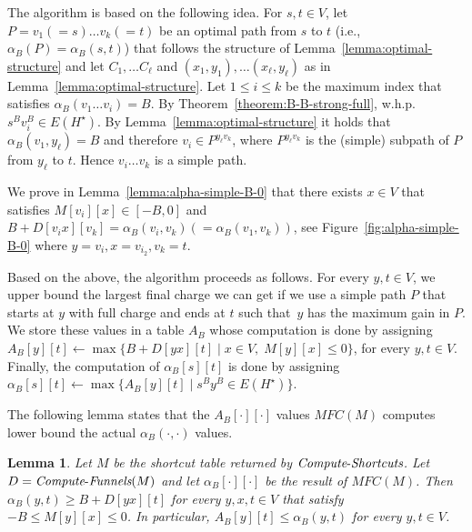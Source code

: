 \documentclass[11pt]{article}
\newtheorem{lemma}[theorem]{Lemma}
\newcommand{\ComputeF}{\mbox{{\it Compute}-{\it Funnels}}}
\newcommand{\ComputeS}{\mbox{{\it Compute}-{\it Shortcuts}}}
\begin{document}
The algorithm is based on the following idea. For $s,t \in V$, let~$P=v_1(=s)\ldots v_k(=t)$ be an optimal path from $s$ to $t$ (i.e., $\alpha_B(P)=\alpha_B(s,t)$) that follows the structure of Lemma~\ref{lemma:optimal-structure} and let $C_1, \ldots C_{\ell}$ and $(x_1,y_1),\ldots(x_{\ell},y_{\ell})$ as in Lemma~\ref{lemma:optimal-structure}.
Let $1\le i \le k$ be the maximum index that satisfies $\alpha_B(v_1 \ldots v_i) = B$. By Theorem~\ref{theorem:B-B-strong-full}, w.h.p.\ $s^B v_i^B \in E(H^\star)$. 
By Lemma~\ref{lemma:optimal-structure} it holds that $\alpha_B(v_1,y_{\ell})=B$ and therefore $v_i \in P^{y_{\ell}v_k}$, where $P^{y_{\ell}v_k}$ is the (simple) subpath of $P$ from $y_{\ell}$ to $t$. Hence $v_i \ldots v_k$ is a simple path.


We prove in Lemma~\ref{lemma:alpha-simple-B-0} that there exists $x\in V$ that satisfies $M[v_i][x]\in [-B,0]$ and $B+D[v_i x][v_k] = \alpha_B(v_i,v_k)(=\alpha_B(v_1,v_k))$, see Figure~\ref{fig:alpha-simple-B-0} where $y=v_i, x=v_{i_2},v_k=t$. 


Based on the above, the algorithm proceeds as follows. For every $y,t\in V$, we upper bound the largest final charge we can get if we use a simple path $P$ that starts at $y$ with full charge and ends at $t$ such that~$y$ has the maximum gain in $P$. We store these values in a table $A_B$ whose computation is done by assigning $A_B[y][t] \gets \max \{B+D[yx][t] \mid x\in V, \; M[y][x] \le 0 \} $, for every $y,t\in V$. Finally, the computation of  $\alpha_B[s][t]$ is done by assigning $\alpha_B[s][t] \gets \max \{ A_B[y][t] \mid s^B y^B \in E(H^\star)\}$.


The following lemma states that the $A_B[\cdot][\cdot]$ values $MFC(M)$ computes lower bound the actual $\alpha_B(\cdot,\cdot)$ values.

\begin{lemma}\label{lem:alphaB-bounds-D}
    Let $M$ be the shortcut table returned by $\ComputeS$. Let $D=\ComputeF(M)$ and let $\alpha_B[\cdot][\cdot]$ be the result of $MFC(M)$. Then $\alpha_B(y,t) \ge B +  D[yx][t]$ for every $y,x,t\in V$ that satisfy $-B \le M[y][x] \le 0$. In particular, $A_B[y][t] \le \alpha_B(y,t)$ for every $y,t\in V$.
\end{lemma}
\end{document}
